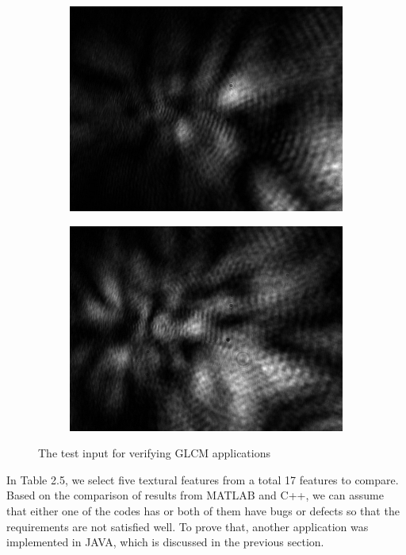 \begin{figure}[!b]
\begin{subfigure}[b]{0.5\textwidth}
    \includegraphics[width=\textwidth]{PicA1002}
    \caption{}
  \end{subfigure}
  \begin{subfigure}[b]{0.5\textwidth}
    \includegraphics[width=\textwidth]{PicA1003}
    \caption{}
  \end{subfigure}
  \caption{The test input for verifying GLCM applications}
\end{figure}
In Table 2.5, we select five textural features from a total 17 features to compare. Based on the comparison of results from MATLAB and C++, we can assume that either one of the codes has or both of them have bugs or defects so that the requirements are not satisfied well. To prove that, another application was implemented in JAVA, which is discussed in the previous section. 
